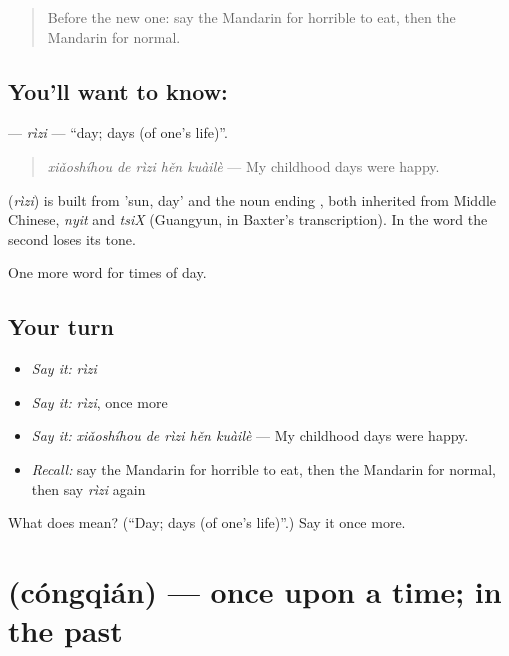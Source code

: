 \begin{quote}
Before the new one: say the Mandarin for horrible to eat, then the Mandarin for normal.
\end{quote}

\subsection*{You'll want to know: }
\textbf{} — \emph{rìzi} — \textquotedblleft{}day; days (of one's life)\textquotedblright{}.

\begin{quote}
\textbf{} \emph{xiǎoshíhou de rìzi hěn kuàilè} — My childhood days were happy.
\end{quote}

\begin{cousinweb}
\textbf{} (\emph{rìzi}) is built from  'sun, day' and the noun ending , both inherited from Middle Chinese, \emph{nyit} and \emph{tsiX} (Guangyun, in Baxter's transcription). In the word the second loses its tone.
\end{cousinweb}

\begin{grammarlens}[title={What you've built}]
One more word for times of day.
\end{grammarlens}

\subsection*{Your turn}
\begin{itemize}
\raggedright
  \item \emph{Say it:} \emph{rìzi}
  \item \emph{Say it:} \emph{rìzi}, once more
  \item \emph{Say it:} \emph{xiǎoshíhou de rìzi hěn kuàilè} — My childhood days were happy.
  \item \emph{Recall:} say the Mandarin for horrible to eat, then the Mandarin for normal, then say \emph{rìzi} again
\end{itemize}

\begin{tcolorbox}[breakable,colback=teal!4,colframe=teal!35!black,title={Before you move on}]
What does  mean? (\textquotedblleft{}Day; days (of one's life)\textquotedblright{}.) Say it once more.
\end{tcolorbox}
\section[\texorpdfstring{\zh{从前} (cóngqián)}{从前 (cóngqián)}]{ (cóngqián) — once upon a time; in the past}

